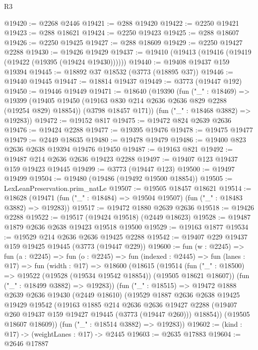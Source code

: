 \begin{lexlean}{R3}
\begin{coremodule}
@19420 := @2268 @2446
@19421 := @288 @19420
@19422 := @2250 @19421
@19423 := @288 @18621
@19424 := @2250 @19423
@19425 := @288 @18607
@19426 := @2250 @19425
@19427 := @288 @18609
@19429 := @2250 @19427 @2288
@19430 := @19426 @19429
@19437 := @19410 (@19413 (@19416 (@19419 (@19422 (@19395 (@19424 @19430))))))
@19440 := @19408 @19437 @159 @19394
@19445 := @18892 @37 @18532 (@3773 (@18895 @37))
@19446 := @19440 @19445
@19447 := @18814 @19437
@19449 := @3773 (@19447 @192)
@19450 := @19446 @19449
@19471 := @18640
    (@19390
      (fun ("_" : @18469) =>
      @19399
        (@19405 @19450 (@19163 @830 @214 @2636 @2636 @829 @2288 (@19254 @829) @18854))
        (@3798 @18457 @171))
      (fun ("_" : @18468 @3882) => @19283))
@19472 := @19152 @817
@19475 := @19472 @824 @2639 @2636
@19476 := @19424 @2288
@19477 := @19395 @19476
@19478 := @19475 @19477
@19479 := @2449 @18635
@19480 := @19478 @19479
@19486 := @19400 @823 @2636 @2638 @19394 @19476 @19450
@19487 := @19163 @821
@19492 := @19487 @214 @2636 @2636 @19423 @2288
@19497 := @19407 @123 @19437 @159 @19423 @19445
@19499 := @3773 (@19447 @123)
@19500 := @19497 @19499
@19504 := @19480 (@19486 (@19492 @19500 @18854))
@19505 := LexLeanPreservation.prim_natLe
@19507 := @19505 @18457 @18621
@19514 := @18628 (@19471 (fun ("_" : @18484) => @19504 @19507) (fun ("_" : @18483 @3882) => @19283))
@19517 := @19472 @1880 @2639 @2636
@19518 := @19426 @2288
@19522 := @19517 (@19424 @19518) (@2449 @18623)
@19528 := @19487 @1879 @2636 @2638 @19423 @19518 @19500
@19529 := @19163 @1877
@19534 := @19529 @214 @2636 @2636 @19425 @2288
@19542 := @19407 @229 @19437 @159 @19425 @19445 (@3773 (@19447 @229))
@19600 := fun (w : @2245) =>
  fun (a : @2245) =>
  fun (o : @2245) =>
  fun (indexed : @2445) =>
  fun (lanes : @17) =>
  fun (width : @17) =>
  @18600
    (@18615
      (@19514
        (fun ("_" : @18500) => @19522 (@19528 (@19534 @19542 @18854)) (@19505 @18621 @18607))
        (fun ("_" : @18499 @3882) => @19283))
      (fun ("_" : @18515) =>
      @19472
        @1888
        @2639
        @2636
        @19430
        (@2449 @18610)
        (@19529
          @1887
          @2636
          @2638
          @19425
          @19429
          @19542
          (@19163
            @1885
            @214
            @2636
            @2636
            @19427
            @2288
            (@19407 @260 @19437 @159 @19427 @19445 (@3773 (@19447 @260)))
            @18854))
        (@19505 @18607 @18609))
      (fun ("_" : @18514 @3882) => @19283))
@19602 := (kind : @17) -> (weightLanes : @17) -> @2445
@19603 := @2635 @17883
@19604 := @2646 @17887

\end{coremodule}
\end{lexlean}
